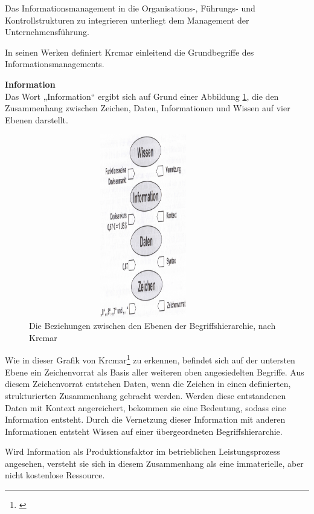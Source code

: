 Das Informationsmanagement in die Organisations-, Führungs- und Kontrollstrukturen zu integrieren unterliegt dem Management der Unternehmensführung.

In seinen Werken definiert Krcmar einleitend die Grundbegriffe des Informationsmanagements.

\textbf{Information}\\
Das Wort „Information“ ergibt sich auf Grund einer Abbildung \ref{fig_ebenen_begriffshierarchie}, die den Zusammenhang zwischen Zeichen, Daten, Informationen und Wissen auf vier Ebenen darstellt.

\begin{figure}[h!]
	\centering
	\includegraphics[width=10cm, height=8cm]
	{kapitel/gruppe1_1/bilder/ebenen_der_begriffshierarchie}
	\caption{Die Beziehungen zwischen den Ebenen der Begriffshierarchie, nach Krcmar}
	\label{fig_ebenen_begriffshierarchie}
\end{figure}

Wie in dieser Grafik von Krcmar\footnote{\cite{krcmar_einfuhrung_2015}} zu erkennen, befindet sich auf der untersten Ebene ein Zeichenvorrat als Basis aller weiteren oben angesiedelten Begriffe. 
Aus diesem Zeichenvorrat entstehen Daten, wenn die Zeichen in einen definierten, strukturierten Zusammenhang gebracht werden.
Werden diese entstandenen Daten mit Kontext angereichert, bekommen sie eine Bedeutung, sodass eine Information entsteht. 
Durch die Vernetzung dieser Information mit anderen Informationen entsteht Wissen auf einer übergeordneten Begriffshierarchie.

Wird Information als Produktionsfaktor im betrieblichen Leistungsprozess angesehen, 
versteht sie sich in diesem Zusammenhang als eine immaterielle, aber nicht kostenlose Ressource.


